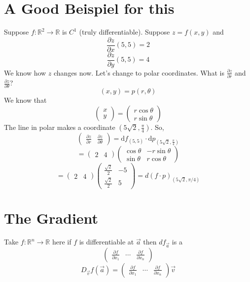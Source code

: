 \documentclass[letter]{article}
\begin{document}
\section*{A Good Beispiel for this} 
Suppose $f: \mathbb{R}^2 \to \mathbb{R}$ is $C^{1}$ (truly differentiable). Suppose $z = f(x,y)$ and 
\[
\frac{\partial z}{ \partial x} (5,5) = 2
\] 
\[
\frac{\partial z}{ \partial y } (5,5) = 4
\] 
We know how $z$ changes now. Let's change to polar coordinates. What is $\frac{\partial z}{\partial r}$ and $\frac{\partial z}{ \partial \theta}$? 
\[
	(x,y) = p(r, \theta)
\] We know that 
\[
\begin{pmatrix} x \\ y \end{pmatrix} = \begin{pmatrix} r \cos \theta \\ r \sin \theta \end{pmatrix} 
\]
The line in polar makes a coordinate $(5 \sqrt{2} , \frac{\pi}{4})$. So, 
\[
	\begin{pmatrix} \frac{\partial z}{ \partial r} & \frac{\partial z}{\partial \theta} \end{pmatrix} = 
	\mathrm{d} f_{(5,5)} \cdot \mathrm{d} p_{(5\sqrt{2} , \frac{\pi}{4}  )} 
\] 
\[
	= \begin{pmatrix} 2 & 4 \end{pmatrix} 
	\begin{pmatrix} \cos \theta & - r \sin \theta \\ 
	\sin \theta & r \cos \theta \end{pmatrix} 
\]
\[
	= \begin{pmatrix} 2 & 4 \end{pmatrix}  
	\begin{pmatrix} \frac{\sqrt{2} }{2} & -5 \\ 
	\frac{\sqrt{2} }{2} & 5\end{pmatrix}  = d (f \cdot  p)_{(5 \sqrt{2} , \pi / 4 )}
\] 

\section*{The Gradient} 
Take $f: \mathbb{R}^{n} \to  \mathbb{R}$ here if $f$ is differentiable at $\vec{a}$ then $df_{\vec{a}}$ is a  \[
	\begin{pmatrix} \frac{\partial f}{\partial x_1} & \cdots & \frac{\partial f}{\partial x_n} \end{pmatrix} 
\] 
\[
	D_{\vec{v}} f(\vec{a}) = 
	\begin{pmatrix} \frac{\partial f}{\partial x_1} & \cdots & \frac{\partial f}{\partial x_n} \end{pmatrix} \vec{v}
\] 
\end{document}

